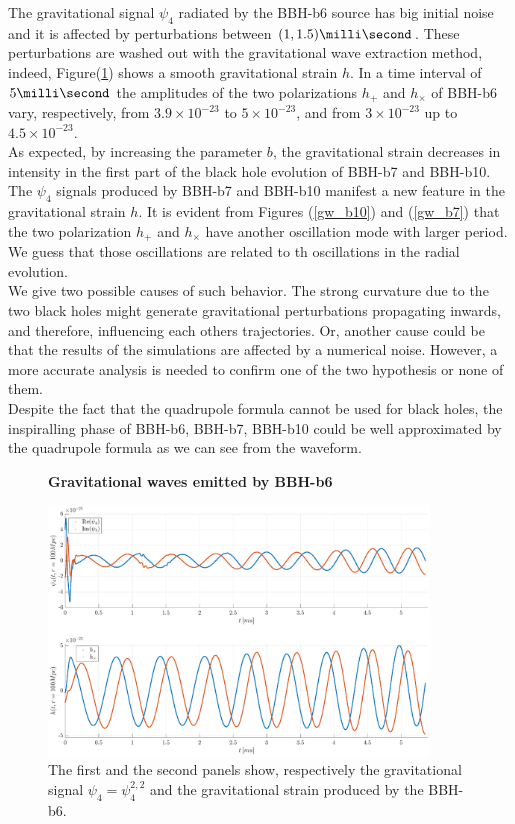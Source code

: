 The gravitational signal $\psi_4$ radiated by the BBH-b6 source has big initial noise and it is affected by perturbations between $(1,1.5) \milli \second$. 
These perturbations are washed out with the gravitational wave extraction method, indeed, Figure(\ref{gw_b6}) shows a smooth gravitational strain $h$. 
In a time interval of $5 \milli \second$ the amplitudes of the two polarizations $h_+$ and $h_{\times}$ of BBH-b6 vary, respectively, from $3.9\times 10^{-23}$ to $5\times 10^{-23}$, and from $3\times 10^{-23}$ up to $4.5\times 10^{-23}$.\\
As expected, by increasing the parameter $b$, the gravitational strain decreases in intensity in the first part of the black hole evolution of BBH-b7 and BBH-b10.
The $\psi_4$ signals produced by BBH-b7 and BBH-b10 manifest a new feature in the gravitational strain $h$.
It is evident from Figures (\ref{gw_b10}) and (\ref{gw_b7}) that the two polarization $h_{+}$ and $h_{\times}$ have another oscillation mode with larger period.
We guess that those oscillations are related to th oscillations in the radial evolution.\\
We give two possible causes of such behavior.
The strong curvature due to the two black holes might generate gravitational perturbations propagating inwards, and therefore, influencing each others trajectories.
Or, another cause could be that the results of the simulations are affected by a numerical noise.
However, a more accurate analysis is needed to confirm one of the two hypothesis or none of them.\\
Despite the fact that the quadrupole formula cannot be used for black holes, the inspiralling phase of BBH-b6, BBH-b7, BBH-b10 could be well approximated by the quadrupole formula as we can see from the waveform.\par
\begin{figure}[H]
\centering
    \textbf{Gravitational waves emitted by BBH-b6}\par\medskip
\centering
\includegraphics[width=0.9\textwidth]{numerical_evolution/gw_b6.eps}
   \caption{The first and the second panels show, respectively the gravitational signal $\psi_4=\psi_4 ^{2,2}$ and the gravitational strain produced by the BBH-b6.}
      \label{gw_b6}
\end{figure}
